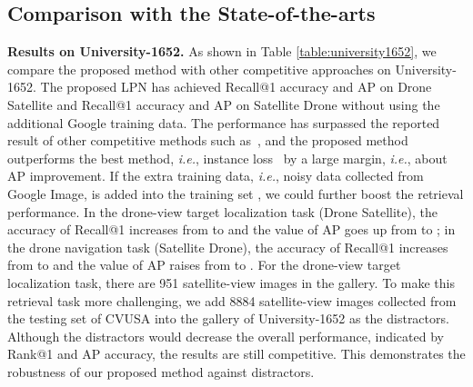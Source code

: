 \documentclass[journal]{IEEEtran}
\def\ie{\emph{i.e.}}
\begin{document}
\subsection{Comparison with the State-of-the-arts}\label{sota}
\textbf{Results on University-1652.} 
As shown in Table \ref{table:university1652}, we compare the proposed method with other competitive approaches on University-1652. The proposed LPN has achieved  Recall@1 accuracy and  AP on Drone  Satellite and  Recall@1 accuracy and  AP on Satellite  Drone without using the additional Google training data. 
The performance has surpassed the reported result of other competitive methods such as~\cite{lin_learning_2015,workman_wide-area_2015,chechik2009large,deng2018triplet,hu_cvm-net_2018,liu_lending_2019}, and the proposed method outperforms the best method, \ie, instance loss~\cite{zheng_university-1652_nodate} by a large margin, \ie, about  AP improvement.
If the extra training data, \ie, noisy data collected from Google Image, is added into the training set \cite{zheng_university-1652_nodate}, we could further boost the retrieval performance. In the drone-view target localization task (Drone  Satellite), the accuracy of Recall@1 increases from  to  and the value of AP goes up from  to ; in the drone navigation task (Satellite  Drone), the accuracy of Recall@1 increases from  to  and the value of AP raises from  to . For the drone-view target localization task, there are 951 satellite-view images in the gallery. To make this retrieval task more challenging, we add 8884 satellite-view images collected from the testing set of CVUSA into the gallery of University-1652 as the distractors. Although the distractors would decrease the overall performance, indicated by Rank@1 and AP accuracy, the results are still competitive. This demonstrates the robustness of our proposed method against distractors.
\end{document}
